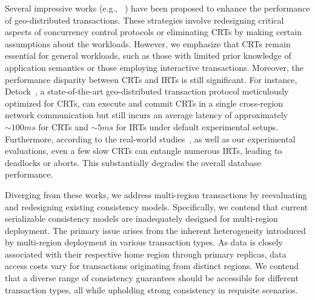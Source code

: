 Several impressive works (e.g., ~\cite{ov:vldb19, nguyen2023detock, slog:vldb19, calvin, janus:osdi16}) have been proposed to enhance the performance of geo-distributed transactions. These strategies involve redesigning critical aspects of concurrency control protocols or eliminating CRTs by making certain assumptions about the workloads. However, we emphasize that CRTs remain essential for general workloads, such as those with limited prior knowledge of application semantics or those employing interactive transactions. Moreover, the performance disparity between CRTs and IRTs is still significant. For instance, Detock~\cite{nguyen2023detock}, a state-of-the-art geo-distributed transaction protocol meticulously optimized for CRTs, can execute and commit CRTs in a single cross-region network communication but still incurs an average latency of approximately $\sim100ms$ for CRTs and $\sim5ms$ for IRTs under default experimental setups.
Furthermore, according to the real-world studies~\cite{nguyen2023detock, chen2021achieving, ov:vldb19}, as well as our experimental evaluations, even a few slow CRTs can entangle numerous IRTs, leading to deadlocks or aborts. This substantially degrades the overall database performance.


Diverging from these works, we address multi-region transactions by reevaluating and redesigning existing consistency models. Specifically, we contend that current serializable consistency models are inadequately designed for multi-region deployment. The primary issue arises from the inherent heterogeneity introduced by multi-region deployment in various transaction types. As data is closely associated with their respective home region through primary replicas, data access costs vary for transactions originating from distinct regions. We contend that a diverse range of consistency guarantees should be accessible for different transaction types, all while upholding strong consistency in requisite scenarios.

